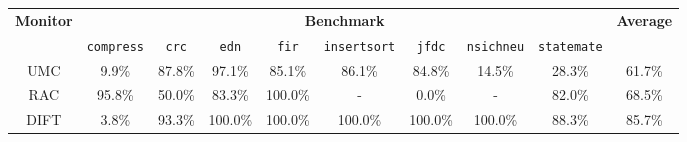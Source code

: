 

\begin{tabular}{|c|c|c|c|c|c|c|c|c|c|}
\hline

\multirow{2}{*}{\bf Monitor} & \multicolumn{8}{c|}{\bf Benchmark} & \multirow{2}{*}{\bf Average} \\ \cline{2-9}
 & {\tt compress} & {\tt crc} & {\tt edn} & {\tt fir} & {\tt insertsort} & {\tt jfdc} & {\tt nsichneu} & {\tt statemate} & \\ \hline \hline

UMC & 9.9\% & 87.8\% & 97.1\% & 85.1\% & 86.1\% & 84.8\% & 14.5\% & 28.3\% & 61.7\% \\\hline
RAC & 95.8\% & 50.0\% & 83.3\% & 100.0\% & - & 0.0\% & - & 82.0\% & 68.5\% \\\hline
DIFT & 3.8\% & 93.3\% & 100.0\% & 100.0\% & 100.0\% & 100.0\% & 100.0\% & 88.3\% & 85.7\% \\\hline

\end{tabular}

